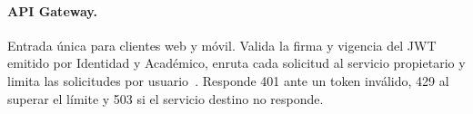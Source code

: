 \paragraph{API Gateway.}
Entrada única para clientes web y móvil. Valida la firma y vigencia del JWT
emitido por Identidad y Académico, enruta cada solicitud al servicio
propietario y limita las solicitudes por usuario~\cite{haindl2024interservice}.
Responde 401 ante un token inválido, 429 al superar el límite y 503 si el
servicio destino no responde.